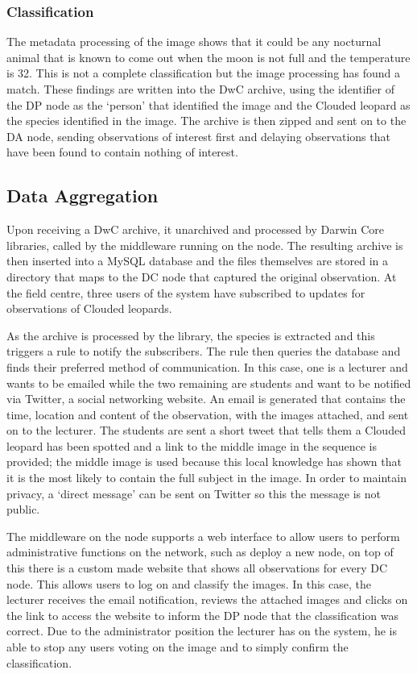 		\subsubsection{Classification}
		The metadata processing of the image shows that it could be any nocturnal animal that is known to come out when the moon is not full and the temperature is 32\celsius. This is not a complete classification but the image processing has found a match. These findings are written into the DwC archive, using the identifier of the DP node as the `person' that identified the image and the Clouded leopard as the species identified in the image. The archive is then zipped and sent on to the DA node, sending observations of interest first and delaying observations that have been found to contain nothing of interest.
			
	\subsection{Data Aggregation}		
			Upon receiving a DwC archive, it unarchived and processed by Darwin Core libraries, called by the middleware running on the node. The resulting archive is then inserted into a MySQL database and the files themselves are stored in a directory that maps to the DC node that captured the original observation. At the field centre, three users of the system have subscribed to updates for observations of Clouded leopards.
			
			As the archive is processed by the library, the species is extracted and this triggers a rule to notify the subscribers. The rule then queries the database and finds their preferred method of communication. In this case, one is a lecturer and wants to be emailed while the two remaining are students and want to be notified via Twitter, a social networking website. An email is generated that contains the time, location and content of the observation, with the images attached, and sent on to the lecturer. The students are sent a short tweet that tells them a Clouded leopard has been spotted and a link to the middle image in the sequence is provided; the middle image is used because this local knowledge has shown that it is the most likely to contain the full subject in the image. In order to maintain privacy, a `direct message' can be sent on Twitter so this the message is not public.
			
			The middleware on the node supports a web interface to allow users to perform administrative functions on the network, such as deploy a new node, on top of this there is a custom made website that shows all observations for every DC node. This allows users to log on and classify the images. In this case, the lecturer receives the email notification, reviews the attached images and clicks on the link to access the website to inform the DP node that the classification was correct. Due to the administrator position the lecturer has on the system, he is able to stop any users voting on the image and to simply confirm the classification.
			
